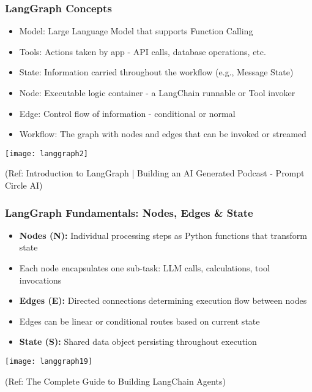 \begin{frame}\frametitle{LangGraph Concepts}
\begin{itemize}
\item Model: Large Language Model that supports Function Calling
\item Tools: Actions taken by app - API calls, database operations, etc.
\item State: Information carried throughout the workflow (e.g., Message State)
\item Node: Executable logic container - a LangChain runnable or Tool invoker
\item Edge: Control flow of information - conditional or normal
\item Workflow: The graph with nodes and edges that can be invoked or streamed
\end{itemize}

\begin{center}
\texttt{[image: langgraph2]}
\end{center}	  
{\tiny (Ref: Introduction to LangGraph | Building an AI Generated Podcast - Prompt Circle AI)}
\end{frame}


\begin{frame}[fragile]\frametitle{LangGraph Fundamentals: Nodes, Edges \& State}


      \begin{itemize}
        \item \textbf{Nodes (N):} Individual processing steps as Python functions that transform state
        \item Each node encapsulates one sub-task: LLM calls, calculations, tool invocations
        \item \textbf{Edges (E):} Directed connections determining execution flow between nodes
        \item Edges can be linear or conditional routes based on current state
        \item \textbf{State (S):} Shared data object persisting throughout execution
      \end{itemize}


\begin{center}
\texttt{[image: langgraph19]}

{\tiny (Ref: The Complete Guide to Building LangChain Agents)}
\end{center}

  

\end{frame}


